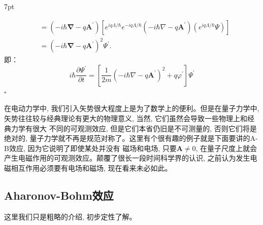 \documentclass[a4paper,zihao=-4,linespread=1]{ctexrep}
\newenvironment{thinknote}{%
\def\FrameCommand{%
\hspace{1pt}%
{\color{BurlyWood}\vrule width 2pt}%
{\color{formalshade}\vrule width 4pt}%
\colorbox{formalshade}%
}%
\MakeFramed{\advance\hsize-\width\FrameRestore}%
\noindent\hspace{-4.55pt}%
\begin{adjustwidth}{}{7pt}%
\vspace{2pt}\vspace{2pt}%
}
{%
\vspace{2pt}\end{adjustwidth}\endMakeFramed%
}
\begin{document}
\begin{thinknote}
\begin{equation}
\begin{aligned}
            &=\left(-i \hbar \boldsymbol{\nabla}-q \mathbf{A}^{\prime}\right)\left[e^{i q \Lambda / \hbar} e^{-i q \Lambda / \hbar}\left(-i \hbar \nabla-q \mathbf{A}^{\prime}\right)\left(e^{i q \Lambda / \hbar} \Psi\right)\right] \\
            &=\left(-i \hbar \boldsymbol{\nabla}-q \mathbf{A}^{\prime}\right)^{2} \Psi^{\prime} .
        \end{aligned}
        \end{equation}
        即：
        \begin{equation}
            i \hbar \frac{\partial \Psi^{\prime}}{\partial t}=\left[\frac{1}{2 m}\left(-i \hbar \nabla-q \mathbf{A}^{\prime}\right)^{2}+q \varphi^{\prime}\right] \Psi^{\prime}
        \end{equation}
        \hfill $\square$\par
    \end{thinknote}
    
    在电动力学中, 我们引入矢势很大程度上是为了数学上的便利。但是在量子力学中, 矢势往往较与经典理论有更大的物理意义, 当然, 它们虽然会导致一些物理上和经典力学有很大
    不同的可观测效应, 但是它们本省仍旧是不可测量的, 否则它们将是绝对的, 量子力学就不再是规范对称了。这里有个很有趣的例子就是下面要讲的A-B效应, 因为它说明了即使某处并没有
    磁场和电场, 只要$\mathbf{A}\neq 0$, 在量子尺度上就会产生电磁作用的可观测效应。颠覆了很长一段时间科学界的认识, 之前认为发生电磁相互作用必须要有电场和磁场, 现在看来未必如此。 
    
    \subsection*{Aharonov-Bohm效应}
    这里我们只是粗略的介绍, 初步定性了解。
\end{document}
